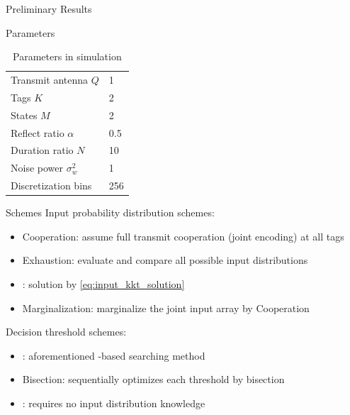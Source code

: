 \documentclass[9pt]{beamer}
\begin{document}
	\begin{section}{Preliminary Results}
		\begin{frame}{Parameters}
			\begin{table}[t!]
				\centering
				\caption{Parameters in simulation}
				\begin{tabular}{ll}
					Transmit antenna $Q$          & 1     \\
					Tags $K$                      & 2     \\
					States $M$                    & 2     \\
					Reflect ratio $\alpha$        & 0.5   \\
					Duration ratio $N$            & 10    \\
					Noise power $\sigma_w^2$      & 1     \\
					Discretization bins           & 256
				\end{tabular}
				\label{ta:parameters}
			\end{table}
		\end{frame}

		\begin{frame}{Schemes}
			Input probability distribution schemes:
			\begin{itemize}
				\item Cooperation: assume full transmit cooperation (joint encoding) at all tags
				\item Exhaustion: evaluate and compare all possible input distributions
				\item {}: solution by \eqref{eq:input_kkt_solution}
				\item Marginalization: marginalize the joint input array by Cooperation
			\end{itemize}

			Decision threshold schemes:
			\begin{itemize}
				\item {}: aforementioned -based searching method \cite{He2021}
				\item Bisection: sequentially optimizes each threshold by bisection \cite{Nguyen2020a}
				\item {}: requires no input distribution knowledge \cite{Qian2019}
			\end{itemize}
		\end{frame}


\end{section}
\end{document}
